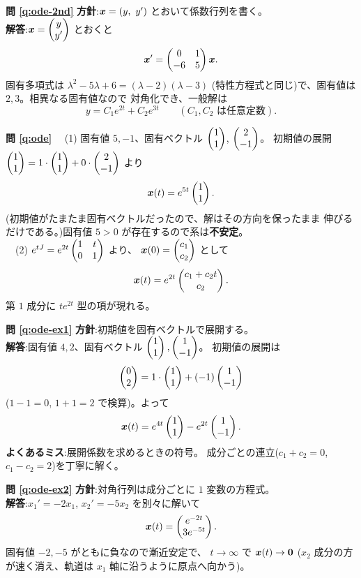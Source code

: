 \bigskip
\noindent\textbf{問 \ref{q:ode-2nd}}\quad
\textbf{方針}:$\vect{x} = (y,\ y')$ とおいて係数行列を書く。\\
\textbf{解答}:$\bm{x} = \begin{pmatrix}y \\ y'\end{pmatrix}$ とおくと
\[
\bm{x}' = \begin{pmatrix}0 & 1 \\ -6 & 5\end{pmatrix}\bm{x}.
\]
固有多項式は $\lambda^2 - 5\lambda + 6 = (\lambda - 2)(\lambda - 3)$
(特性方程式と同じ)で、固有値は $2, 3$。相異なる固有値なので
対角化でき、一般解は
\[
y = C_1 e^{2t} + C_2 e^{3t} \qquad (C_1, C_2 \text{ は任意定数}).
\]

\bigskip
\noindent\textbf{問 \ref{q:ode}}\quad
　(1) 固有値 $5, -1$、固有ベクトル $\begin{pmatrix}1 \\ 1\end{pmatrix}$, $\begin{pmatrix}2 \\ -1\end{pmatrix}$。
初期値の展開 $\begin{pmatrix}1 \\ 1\end{pmatrix} = 1 \cdot \begin{pmatrix}1 \\ 1\end{pmatrix} + 0 \cdot \begin{pmatrix}2 \\ -1\end{pmatrix}$ より
\[
\bm{x}(t) = e^{5t}\begin{pmatrix}1 \\ 1\end{pmatrix}.
\]
(初期値がたまたま固有ベクトルだったので、解はその方向を保ったまま
伸びるだけである。)固有値 $5 > 0$ が存在するので系は\textbf{不安定}。\\
　(2) $e^{tJ} = e^{2t}\begin{pmatrix}1 & t \\ 0 & 1\end{pmatrix}$ より、
$\bm{x}(0) = \begin{pmatrix}c_1 \\ c_2\end{pmatrix}$ として
\[
\bm{x}(t) = e^{2t}\begin{pmatrix}c_1 + c_2 t \\ c_2\end{pmatrix}.
\]
第 $1$ 成分に $te^{2t}$ 型の項が現れる。

\bigskip
\noindent\textbf{問 \ref{q:ode-ex1}}\quad
\textbf{方針}:初期値を固有ベクトルで展開する。\\
\textbf{解答}:固有値 $4, 2$、固有ベクトル $\begin{pmatrix}1 \\ 1\end{pmatrix}, \begin{pmatrix}1 \\ -1\end{pmatrix}$。
初期値の展開は
\[
\begin{pmatrix}0 \\ 2\end{pmatrix} = 1 \cdot \begin{pmatrix}1 \\ 1\end{pmatrix} + (-1)\begin{pmatrix}1 \\ -1\end{pmatrix}
\]
($1 - 1 = 0$, $1 + 1 = 2$ で検算)。よって
\[
\bm{x}(t) = e^{4t}\begin{pmatrix}1 \\ 1\end{pmatrix} - e^{2t}\begin{pmatrix}1 \\ -1\end{pmatrix}.
\]
\textbf{よくあるミス}:展開係数を求めるときの符号。
成分ごとの連立($c_1 + c_2 = 0$, $c_1 - c_2 = 2$)を丁寧に解く。

\bigskip
\noindent\textbf{問 \ref{q:ode-ex2}}\quad
\textbf{方針}:対角行列は成分ごとに $1$ 変数の方程式。\\
\textbf{解答}:$x_1' = -2x_1$, $x_2' = -5x_2$ を別々に解いて
\[
\bm{x}(t) = \begin{pmatrix}e^{-2t} \\ 3e^{-5t}\end{pmatrix}.
\]
固有値 $-2, -5$ がともに負なので漸近安定で、
$t \to \infty$ で $\bm{x}(t) \to \bm{0}$
($x_2$ 成分の方が速く消え、軌道は $x_1$ 軸に沿うように原点へ向かう)。

